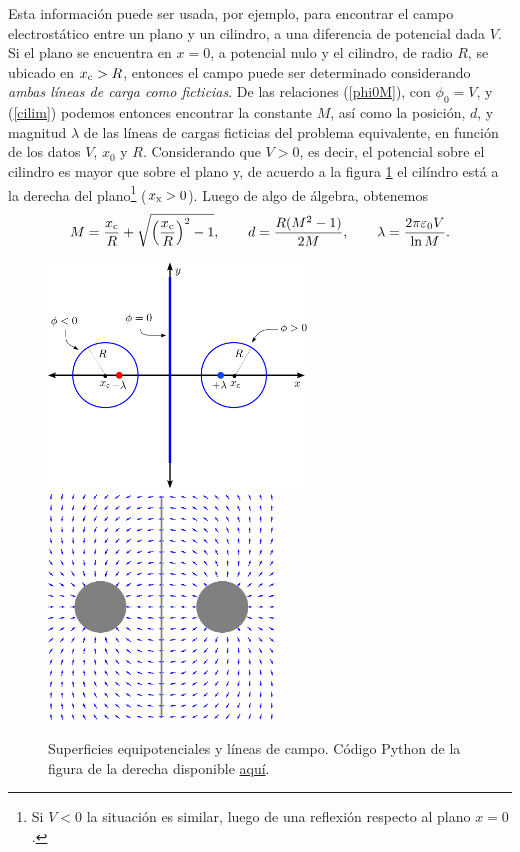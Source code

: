 Esta información puede ser usada, por ejemplo, para encontrar el campo
electrostático entre un plano y un cilindro, a una diferencia de potencial
dada $V$. Si el plano se encuentra en $x=0$, a potencial nulo y el cilindro, de
radio $R$, se ubicado en $x_{\rm c}>R$, entonces el campo puede ser determinado
considerando \textit{ambas líneas de carga como ficticias}. De las relaciones
(\ref{phi0M}), con $\phi_0=V$, y (\ref{cilim}) podemos entonces encontrar la
constante $M$, así como la posición, $d$, y magnitud $\lambda$ de las líneas
de cargas ficticias del problema equivalente, en función de los datos $V$,
$x_0$ y $R$. Considerando que $V>0$, es decir, el potencial sobre el cilindro es mayor que sobre el plano y, de acuerdo a la figura \ref{ci04} el cilíndro está a la derecha del plano\footnote{Si $V<0$ la situación es similar, luego de una reflexión respecto al plano $x=0$.} ($x_{\rm x}>0$). Luego de algo de álgebra, obtenemos
\begin{equation}
 M=\frac{x_{\rm c}}{R}+\sqrt{\left(\frac{x_{\rm c}}{R}\right)^2-1}, \qquad
d=\frac{R(M^2-1)}{2M}, \qquad \lambda=\frac{2\pi\varepsilon_0V}{\ln M}.
\end{equation}
\begin{figure}[!h]
\centerline{\includegraphics[height=6cm]{fig/fig-metodo-imagenes-cilindros-02.pdf}
\hspace{1cm}
\includegraphics[height=6cm]{fig/fig-metodo-imagenes-cilindros-03.pdf}}
\caption{Superficies equipotenciales y líneas de campo. Código Python de la figura de la derecha disponible \href{https://github.com/gfrubi/electrodinamica/blob/master/figuras-editables/fig-metodo-imagenes-cilindros-03.py}{aquí}.}
\label{ci04}
\end{figure}

